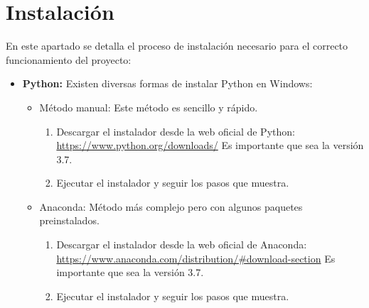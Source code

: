 \section{Instalación}

En este apartado se detalla el proceso de instalación necesario para el correcto funcionamiento del proyecto:

\begin{itemize}
    \item \textbf{Python:} Existen diversas formas de instalar Python en Windows:
        \begin{itemize}
            \item Método manual: Este método es sencillo y rápido.
                \begin{enumerate}
                    \item Descargar el instalador desde la web oficial de Python:
                    \newline
                    \url{https://www.python.org/downloads/}
                    \newline
                    Es importante que sea la versión 3.7.
                    
                    
                    \item Ejecutar el instalador y seguir los pasos que muestra.
                \end{enumerate}
            \item Anaconda: Método más complejo pero con algunos paquetes preinstalados.
                \begin{enumerate}
                    \item Descargar el instalador desde la web oficial de Anaconda:
                    \newline
                    \url{https://www.anaconda.com/distribution/#download-section}
                    \newline
                    Es importante que sea la versión 3.7.
                    
                    
                    \item Ejecutar el instalador y seguir los pasos que muestra.
                \end{enumerate}
        \end{itemize}
        

\end{itemize}
